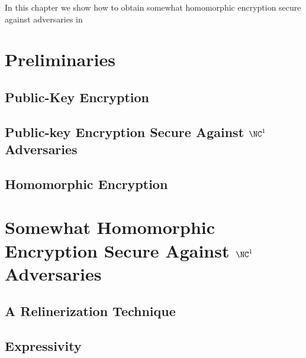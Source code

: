 In this chapter we show how to obtain somewhat homomorphic encryption secure against adversaries in

\section{Preliminaries}


\subsection{Public-Key Encryption}

\subsection{Public-key Encryption Secure Against $\NC^1$ Adversaries}

\subsection{Homomorphic Encryption}

\section{Somewhat Homomorphic Encryption Secure Against $\NC^1$ Adversaries}

\subsection{A Relinerization Technique}

\subsection{Expressivity}

